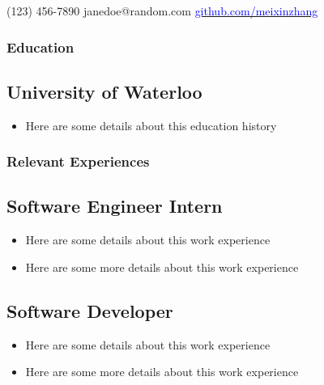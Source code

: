 \documentclass{mxresume}
\begin{document}
\contact
    {(123) 456-7890}
    {janedoe@random.com}
    {\href{https://github.com/meixinzhang} {\textcolor{blue}{github.com/meixinzhang}}}
    {}{}
\vspace*{2mm}
\subsubsection*{\Large{Education}} %
\subsection*{University of Waterloo} 
\begin{itemize}[leftmargin=5mm]
\setlength{\itemsep}{0mm}
\item Here are some details about this education history
\end{itemize}
\subsubsection*{\Large{Relevant Experiences}} %
\subsection*{Software Engineer Intern}
\begin{itemize}[leftmargin=5mm]
\setlength{\itemsep}{0mm}
\item Here are some details about this work experience
\item Here are some more details about this work experience
\end{itemize}
\subsection*{Software Developer}
\begin{itemize}[leftmargin=5mm]
\setlength{\itemsep}{0mm}
\item Here are some details about this work experience
\item Here are some more details about this work experience
\end{itemize}
\end{document}
